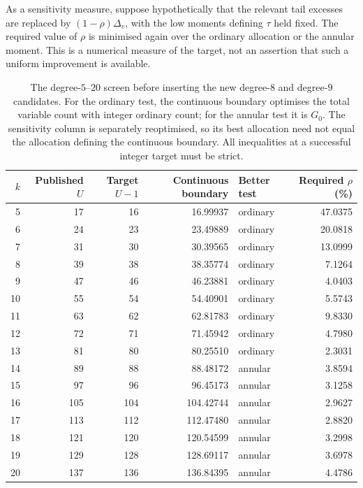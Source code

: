 \documentclass[11pt,letterpaper]{article}
\numberwithin{equation}{section}
\begin{document}
As a sensitivity measure, suppose hypothetically that the relevant tail
excesses are replaced by $(1-\rho)\Delta_v$, with the low moments defining
$\tau$ held fixed. The required value of $\rho$ is minimised again over
the ordinary allocation or the annular moment. This is a numerical measure
of the target, not an assertion that such a uniform improvement is available.

\begin{table}[htbp]
\centering\small
\begin{tabular}{rrrrlr}
\hline
$k$ & Published $U$ & Target $U-1$ & Continuous boundary & Better test
    & Required $\rho$ (\%)\\
\hline
5  &17 &16 &16.99937 &ordinary &47.0375\\
6  &24 &23 &23.49889 &ordinary &20.0818\\
7  &31 &30 &30.39565 &ordinary &13.0999\\
8  &39 &38 &38.35774 &ordinary &7.1264\\
9  &47 &46 &46.23881 &ordinary &4.0403\\
10 &55 &54 &54.40901 &ordinary &5.5743\\
11 &63 &62 &62.81783 &ordinary &9.8330\\
12 &72 &71 &71.45942 &ordinary &4.7980\\
13 &81 &80 &80.25510 &ordinary &2.3031\\
14 &89 &88 &88.48172 &annular &3.8594\\
15 &97 &96 &96.45173 &annular &3.1258\\
16 &105&104&104.42744&annular &2.9627\\
17 &113&112&112.47480&annular &2.8820\\
18 &121&120&120.54599&annular &3.2998\\
19 &129&128&128.69117&annular &3.6978\\
20 &137&136&136.84395&annular &4.4786\\
\hline
\end{tabular}
\caption{The degree-$5$--$20$ screen before inserting the new degree-$8$ and
degree-$9$ candidates. For the ordinary test, the continuous boundary optimises the total
variable count with integer ordinary count; for the annular test it is $G_0$.
The sensitivity column is separately reoptimised, so its best allocation need
not equal the allocation defining the continuous boundary. All inequalities
at a successful integer target must be strict.}
\label{tab:cross-k-baselines}
\end{table}
\end{document}

